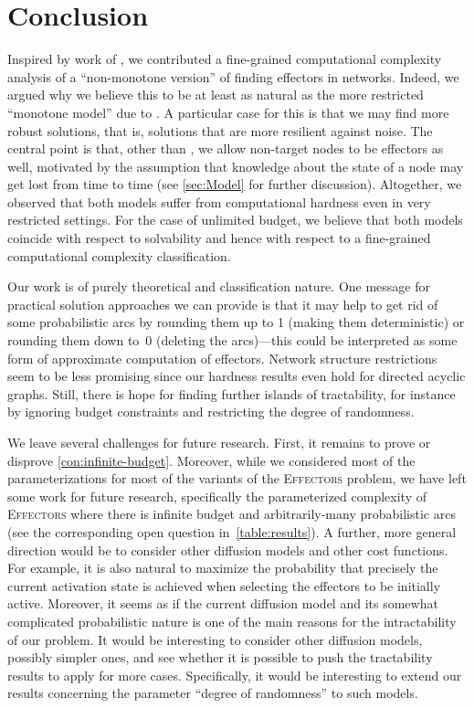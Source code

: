 \documentclass{article}
\newcommand{\probEffectors}{\textsc{Effectors}\xspace}
\begin{document}
\section{Conclusion}
Inspired by work of \citet{LTGMH10}, we contributed a fine-grained computational complexity analysis of a ``non-monotone version'' of finding effectors in networks.
Indeed, we argued why we believe this to be at least as natural as the more restricted ``monotone model'' due to \citet{LTGMH10}. A particular case for this is that we may find more robust solutions, that is, solutions that are more resilient against noise.
The central point is that, other than \citet{LTGMH10}, we allow non-target nodes to be effectors as well, motivated by the assumption that knowledge about the state of a node may get lost from time to time (see \autoref{sec:Model} for further discussion). Altogether, we observed that both models suffer from computational hardness even in very restricted settings. For the case of unlimited budget, we believe that both models coincide with respect to solvability and hence with respect to a fine-grained computational complexity classification.

Our work is of purely theoretical and classification nature. One message for practical solution approaches we can provide is that it may help to get rid of some probabilistic arcs by rounding them up to 1 (making them deterministic) or rounding them down to~0 (deleting the arcs)---this could be interpreted as some form of approximate computation of effectors. Network structure restrictions seem to be less promising since our hardness results even hold for directed acyclic graphs. Still, there is hope for finding further islands of tractability, for instance by ignoring budget constraints and restricting the degree of randomness.

We leave several challenges for future research.
First, it remains to prove or disprove \autoref{con:infinite-budget}.
Moreover,
while we considered most of the parameterizations for most of the variants of the \probEffectors problem,
we have left some work for future research,
specifically the parameterized complexity of \probEffectors where there is infinite budget and arbitrarily-many probabilistic arcs
(see the corresponding open question in~\autoref{table:results}).
A further,
more general direction would be to consider other diffusion models and other cost functions.
For example,
it is also natural to maximize the probability that precisely the current activation state is achieved
when selecting the effectors to be initially active.
Moreover,
it seems as if the current diffusion model and its somewhat complicated probabilistic nature
is one of the main reasons for the intractability of our problem.
It would be interesting to consider other diffusion models,
possibly simpler ones,
and see whether it is possible to push the tractability results to apply for more cases.
Specifically,
it would be interesting to extend our results concerning the parameter ``degree of randomness'' to such models.






\end{document}
